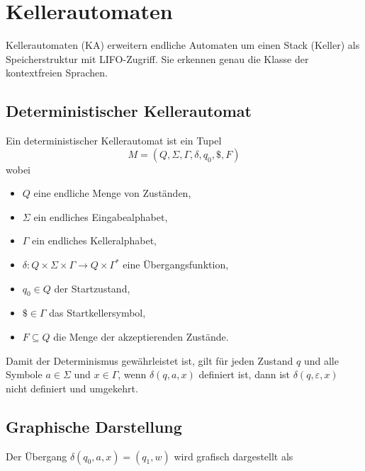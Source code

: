\section{Kellerautomaten}

Kellerautomaten (KA) erweitern endliche Automaten um einen Stack (Keller) als Speicherstruktur mit LIFO-Zugriff.
Sie erkennen genau die Klasse der kontextfreien Sprachen.

\subsection{Deterministischer Kellerautomat }
Ein deterministischer Kellerautomat ist ein Tupel
\[
    M = (Q, \Sigma, \Gamma, \delta, q_0, \$, F)
\]
wobei
\begin{itemize}
    \item \(Q\) eine endliche Menge von Zuständen,
    \item \(\Sigma\) ein endliches Eingabealphabet,
    \item \(\Gamma\) ein endliches Kelleralphabet,
    \item \(\delta : Q \times \Sigma \times \Gamma \to Q \times \Gamma^*\) eine Übergangsfunktion,
    \item \(q_0 \in Q\) der Startzustand,
    \item \(\$ \in \Gamma\) das Startkellersymbol,
    \item \(F \subseteq Q\) die Menge der akzeptierenden Zustände.
\end{itemize}

Damit der Determinismus gewährleistet ist, gilt für jeden Zustand \(q\) und alle Symbole \(a \in \Sigma\) und \(x \in \Gamma\), wenn \(\delta(q, a, x)\) definiert ist, dann ist \(\delta(q, \varepsilon, x)\) nicht definiert und umgekehrt.

\subsection{Graphische Darstellung}
Der Übergang \(\delta(q_0, a, x) = (q_1, w)\) wird grafisch dargestellt als\\
\begin{center}

\end{center}

